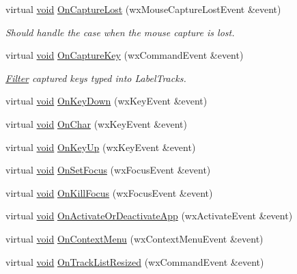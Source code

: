 \begin{DoxyCompactItemize}
\item 
virtual \hyperlink{sound_8c_ae35f5844602719cf66324f4de2a658b3}{void} \hyperlink{class_track_panel_ad1b4ec8ef74ecdbd0852315508cd812d}{On\+Capture\+Lost} (wx\+Mouse\+Capture\+Lost\+Event \&event)
\begin{DoxyCompactList}\small\item\em Should handle the case when the mouse capture is lost. \end{DoxyCompactList}\item 
virtual \hyperlink{sound_8c_ae35f5844602719cf66324f4de2a658b3}{void} \hyperlink{class_track_panel_a0ccda6e0a102609a44b69e7f851ab85c}{On\+Capture\+Key} (wx\+Command\+Event \&event)
\begin{DoxyCompactList}\small\item\em \hyperlink{class_filter}{Filter} captured keys typed into Label\+Tracks. \end{DoxyCompactList}\item 
virtual \hyperlink{sound_8c_ae35f5844602719cf66324f4de2a658b3}{void} \hyperlink{class_track_panel_a92f1df5389ce81091f810dd774f91332}{On\+Key\+Down} (wx\+Key\+Event \&event)
\item 
virtual \hyperlink{sound_8c_ae35f5844602719cf66324f4de2a658b3}{void} \hyperlink{class_track_panel_afc15945f54a80ddcaa085c3f4c52ecdd}{On\+Char} (wx\+Key\+Event \&event)
\item 
virtual \hyperlink{sound_8c_ae35f5844602719cf66324f4de2a658b3}{void} \hyperlink{class_track_panel_ae15fa46232f32310f7f2735deef9c0f7}{On\+Key\+Up} (wx\+Key\+Event \&event)
\item 
virtual \hyperlink{sound_8c_ae35f5844602719cf66324f4de2a658b3}{void} \hyperlink{class_track_panel_aae7271c142238fb34035d155bbfee39d}{On\+Set\+Focus} (wx\+Focus\+Event \&event)
\item 
virtual \hyperlink{sound_8c_ae35f5844602719cf66324f4de2a658b3}{void} \hyperlink{class_track_panel_a06097bc46384863e2880a2bd2ebadb42}{On\+Kill\+Focus} (wx\+Focus\+Event \&event)
\item 
virtual \hyperlink{sound_8c_ae35f5844602719cf66324f4de2a658b3}{void} \hyperlink{class_track_panel_a4065eaeb541297e7e9f2e43d04d17ae5}{On\+Activate\+Or\+Deactivate\+App} (wx\+Activate\+Event \&event)
\item 
virtual \hyperlink{sound_8c_ae35f5844602719cf66324f4de2a658b3}{void} \hyperlink{class_track_panel_a576de7bafcb8fd3afbbb9c53bfc35679}{On\+Context\+Menu} (wx\+Context\+Menu\+Event \&event)
\item 
virtual \hyperlink{sound_8c_ae35f5844602719cf66324f4de2a658b3}{void} \hyperlink{class_track_panel_abb3ee974c78d75af2f7131d4fefefac2}{On\+Track\+List\+Resized} (wx\+Command\+Event \&event)

\end{DoxyCompactItemize}

